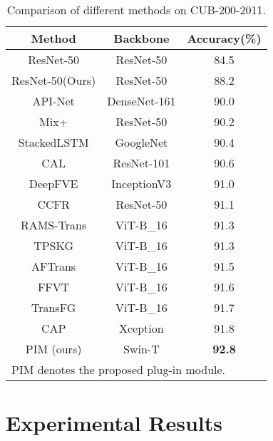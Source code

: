 \documentclass[conference]{IEEEtran}
\begin{document}
\begin{table}[!tp]
\caption{Comparison of different methods on CUB-200-2011.}
\begin{center}
\begin{tabular}{c|c|c}
Method & Backbone & Accuracy(\%) \\
\hline
ResNet-50\cite{TransFG} & ResNet-50 & 84.5 \\
ResNet-50(Ours) & ResNet-50 & 88.2 \\
API-Net\cite{API_Net} & DenseNet-161 & 90.0 \\
Mix+\cite{Mix_plus} & ResNet-50 & 90.2 \\
StackedLSTM\cite{Stacked_LSTM} & GoogleNet & 90.4 \\
CAL\cite{CAL} & ResNet-101 & 90.6 \\
DeepFVE\cite{DeepFVE} & InceptionV3\cite{Inception_v3} & 91.0 \\
CCFR\cite{CCFR} & ResNet-50 & 91.1 \\
RAMS-Trans\cite{RAMS_Trans} & ViT-B\_16 & 91.3 \\
TPSKG\cite{TPSKG} & ViT-B\_16 & 91.3 \\
AFTrans\cite{AFTrans} & ViT-B\_16 & 91.5 \\
FFVT\cite{FFVT} & ViT-B\_16 & 91.6 \\
TransFG\cite{TransFG} & ViT-B\_16 & 91.7 \\
CAP\cite{CAP} & Xception\cite{Xception} & 91.8 \\
\hline
PIM  (ours) & Swin-T & \textbf{92.8}  \\
\hline
\multicolumn{3}{l}{  PIM denotes the proposed plug-in module.}

\end{tabular}
\label{tab1}
\end{center}
\end{table}



\section{Experimental Results}
\end{document}
